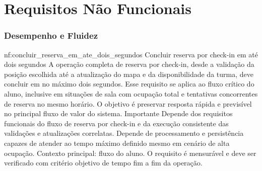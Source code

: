 \section{Requisitos Não Funcionais}

\subsubsection*{Desempenho e Fluidez}
\reqfuncfull
{nf:concluir_reserva_em_ate_dois_segundos}
{Concluir reserva por check-in em até dois segundos}
{A operação completa de reserva por check-in, desde a validação da posição escolhida até a atualização do mapa e da disponibilidade da turma, deve concluir em no máximo dois segundos. Esse requisito se aplica ao fluxo crítico do aluno, inclusive em situações de sala com ocupação total e tentativas concorrentes de reserva no mesmo horário. O objetivo é preservar resposta rápida e previsível no principal fluxo de valor do sistema.}
{Importante}
{Depende dos requisitos funcionais do fluxo de reserva por check-in e da execução consistente das validações e atualizações correlatas. Depende de processamento e persistência capazes de atender ao tempo máximo definido mesmo em cenário de alta ocupação.}
{Contexto principal: fluxo do aluno. O requisito é mensurável e deve ser verificado com critério objetivo de tempo fim a fim da operação.}